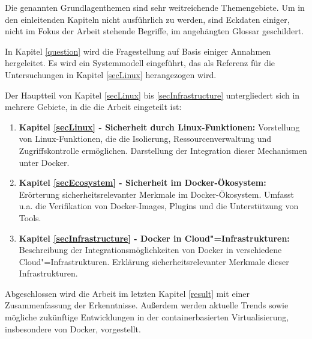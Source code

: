 \documentclass[../main.tex]{subfiles}
\begin{document}
    Die genannten Grundlagenthemen sind sehr weitreichende Themengebiete. Um in den einleitenden Kapiteln nicht ausführlich zu werden, sind Eckdaten einiger, nicht im Fokus der Arbeit stehende Begriffe, im angehängten Glossar geschildert.

    In Kapitel \ref{question} wird die Fragestellung auf Basis einiger Annahmen hergeleitet. Es wird ein Systemmodell eingeführt, das als Referenz für die Untersuchungen in Kapitel \ref{secLinux} herangezogen wird.

    Der Hauptteil von Kapitel \ref{secLinux} bis \ref{secInfrastructure} untergliedert sich in mehrere Gebiete, in die die Arbeit eingeteilt ist:
    \begin{enumerate}
      \item \textbf{Kapitel \ref{secLinux} - Sicherheit durch Linux-Funktionen:} Vorstellung von Linux-Funktionen, die die Isolierung, Ressourcenverwaltung und Zugriffskontrolle ermöglichen. Darstellung der Integration dieser Mechanismen unter Docker.
      \item \textbf{Kapitel \ref{secEcosystem} - Sicherheit im Docker-Ökosystem:} Erörterung sicherheitsrelevanter Merkmale im Docker-Ökosystem. Umfasst u.a. die Verifikation von Docker-Images, Plugins und die Unterstützung von Tools.
      \item \textbf{Kapitel \ref{secInfrastructure} - Docker in Cloud"=Infrastrukturen:} Beschreibung der Integrationsmöglichkeiten von Docker in verschiedene Cloud"=Infrastrukturen. Erklärung sicherheitsrelevanter Merkmale dieser Infrastrukturen.
    \end{enumerate}

    Abgeschlossen wird die Arbeit im letzten Kapitel \ref{result} mit einer Zusammenfassung der Erkenntnisse. Außerdem werden aktuelle Trends sowie mögliche zukünftige Entwicklungen in der containerbasierten Virtualisierung, insbesondere von Docker, vorgestellt.
\end{document}
